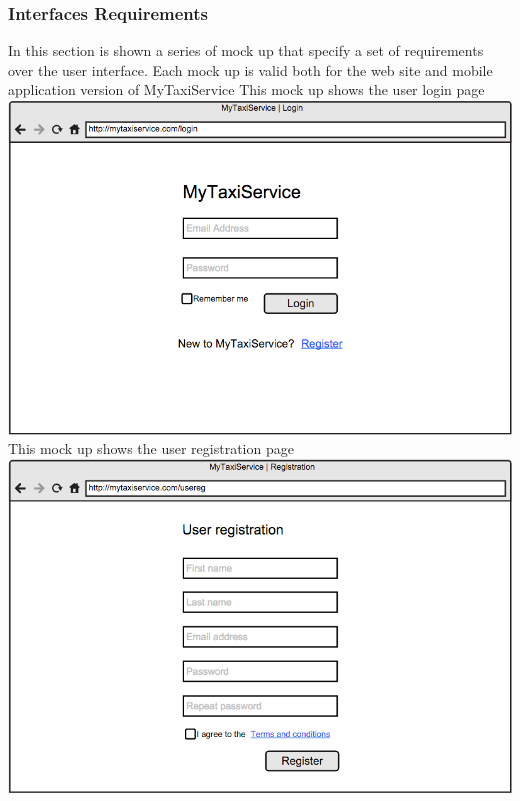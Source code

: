 \documentclass[11pt]{article} %
\begin{document}
      \subsubsection{Interfaces Requirements}
       In this section is shown a series of mock up that specify a set of requirements over the user interface.\newline
       Each mock up is valid both for the web site and mobile application version of MyTaxiService\newline 
        \newline
        This mock up shows the user login page\newline
       \newline
        \includegraphics[scale=0.52]{loginInt.png}\newline
        \newpage
        \noindent
        This  mock up shows the user registration page\newline
	\newline
        \includegraphics[scale=0.52]{userRegInt.png}\newline
\end{document}
